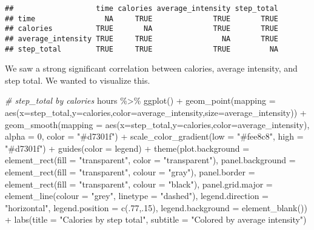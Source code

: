 \documentclass[
]{article}
\newenvironment{Shaded}{\begin{snugshade}}{\end{snugshade}}
\newcommand{\AttributeTok}[1]{\textcolor[rgb]{0.77,0.63,0.00}{#1}}
\newcommand{\CommentTok}[1]{\textcolor[rgb]{0.56,0.35,0.01}{\textit{#1}}}
\newcommand{\DecValTok}[1]{\textcolor[rgb]{0.00,0.00,0.81}{#1}}
\newcommand{\FunctionTok}[1]{\textcolor[rgb]{0.00,0.00,0.00}{#1}}
\newcommand{\NormalTok}[1]{#1}
\newcommand{\SpecialCharTok}[1]{\textcolor[rgb]{0.00,0.00,0.00}{#1}}
\newcommand{\StringTok}[1]{\textcolor[rgb]{0.31,0.60,0.02}{#1}}
\begin{document}
\begin{verbatim}
##                   time calories average_intensity step_total
## time                NA     TRUE              TRUE       TRUE
## calories          TRUE       NA              TRUE       TRUE
## average_intensity TRUE     TRUE                NA       TRUE
## step_total        TRUE     TRUE              TRUE         NA
\end{verbatim}

We saw a strong significant correlation between calories, average
intensity, and step total. We wanted to visualize this.

\begin{Shaded}
\begin{Highlighting}[]
\CommentTok{\# step\_total by calories}
\NormalTok{hours }\SpecialCharTok{\%\textgreater{}\%}
  \FunctionTok{ggplot}\NormalTok{() }\SpecialCharTok{+} 
  \FunctionTok{geom\_point}\NormalTok{(}\AttributeTok{mapping =} \FunctionTok{aes}\NormalTok{(}\AttributeTok{x=}\NormalTok{step\_total,}\AttributeTok{y=}\NormalTok{calories,}\AttributeTok{color=}\NormalTok{average\_intensity,}\AttributeTok{size=}\NormalTok{average\_intensity)) }\SpecialCharTok{+} 
  \FunctionTok{geom\_smooth}\NormalTok{(}\AttributeTok{mapping =} \FunctionTok{aes}\NormalTok{(}\AttributeTok{x=}\NormalTok{step\_total,}\AttributeTok{y=}\NormalTok{calories,}\AttributeTok{color=}\NormalTok{average\_intensity), }\AttributeTok{alpha =} \DecValTok{0}\NormalTok{, }\AttributeTok{color =} \StringTok{"\#d7301f"}\NormalTok{) }\SpecialCharTok{+} 
  \FunctionTok{scale\_color\_gradient}\NormalTok{(}\AttributeTok{low =} \StringTok{"\#fee8c8"}\NormalTok{, }\AttributeTok{high =} \StringTok{"\#d7301f"}\NormalTok{) }\SpecialCharTok{+}
  \FunctionTok{guides}\NormalTok{(}\AttributeTok{color =} \StringTok{\textquotesingle{}legend\textquotesingle{}}\NormalTok{) }\SpecialCharTok{+}
  \FunctionTok{theme}\NormalTok{(}\AttributeTok{plot.background =} \FunctionTok{element\_rect}\NormalTok{(}\AttributeTok{fill =} \StringTok{"transparent"}\NormalTok{, }\AttributeTok{color =} \StringTok{"transparent"}\NormalTok{),}
        \AttributeTok{panel.background =} \FunctionTok{element\_rect}\NormalTok{(}\AttributeTok{fill =} \StringTok{"transparent"}\NormalTok{, }\AttributeTok{colour =} \StringTok{"gray"}\NormalTok{),}
        \AttributeTok{panel.border =} \FunctionTok{element\_rect}\NormalTok{(}\AttributeTok{fill =} \StringTok{"transparent"}\NormalTok{, }\AttributeTok{colour =} \StringTok{"black"}\NormalTok{),}
        \AttributeTok{panel.grid.major =} \FunctionTok{element\_line}\NormalTok{(}\AttributeTok{colour =} \StringTok{"grey"}\NormalTok{, }\AttributeTok{linetype =} \StringTok{"dashed"}\NormalTok{),}
        \AttributeTok{legend.direction =} \StringTok{"horizontal"}\NormalTok{,}
        \AttributeTok{legend.position =} \FunctionTok{c}\NormalTok{(.}\DecValTok{77}\NormalTok{,.}\DecValTok{15}\NormalTok{), }
        \AttributeTok{legend.background =} \FunctionTok{element\_blank}\NormalTok{()) }\SpecialCharTok{+}
  \FunctionTok{labs}\NormalTok{(}\AttributeTok{title =} \StringTok{"Calories by step total"}\NormalTok{, }\AttributeTok{subtitle =} \StringTok{"Colored by average intensity"}\NormalTok{)}
\end{Highlighting}
\end{Shaded}
\end{document}
